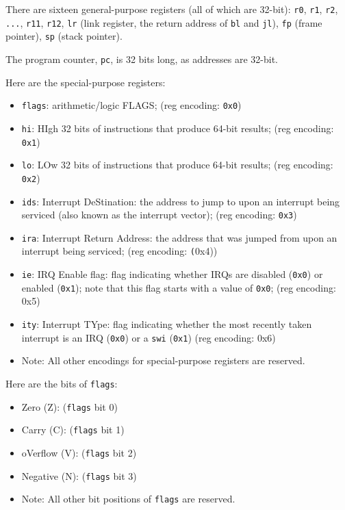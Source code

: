 \documentclass{article}
\begin{document}
	\doublespacing
	There are sixteen general-purpose registers (all of which are 32-bit):
	\texttt{r0}, \texttt{r1},
	\texttt{r2}, \texttt{...}, \texttt{r11}, \texttt{r12},
	\texttt{lr} (link register, the return address of \texttt{bl} and
		\texttt{jl}),
	\texttt{fp} (frame pointer), \texttt{sp} (stack pointer).

	The program counter, \texttt{pc}, is 32 bits long, as addresses are
	32-bit.

	Here are the special-purpose registers:
	\singlespacing
	\begin{itemize}
	\item \texttt{flags}: arithmetic/logic FLAGS;
		(reg encoding: \texttt{0x0})
	\item \texttt{hi}:
		HIgh 32 bits of instructions that produce 64-bit results;
		(reg encoding: \texttt{0x1})
	\item \texttt{lo}:
		LOw 32 bits of instructions that produce 64-bit results;
		(reg encoding: \texttt{0x2})
	\item \texttt{ids}: Interrupt DeStination:
		the address to jump to upon an interrupt being serviced
			(also known as the interrupt vector);
		(reg encoding: \texttt{0x3})
	\item \texttt{ira}: Interrupt Return Address:
		the address that was jumped from upon an interrupt being
			serviced;
		(reg encoding: \texttt(0x4))
	\item \texttt{ie}: IRQ Enable flag:
		flag indicating whether IRQs are
			disabled (\texttt{0x0}) or enabled (\texttt{0x1});
		note that this flag starts with a value of \texttt{0x0};
		(reg encoding: 0x5)
	\item \texttt{ity}: Interrupt TYpe:
		flag indicating whether the most recently taken interrupt is an
			IRQ (\texttt{0x0}) or a \texttt{swi} (\texttt{0x1})
		(reg encoding: 0x6)
	\item Note:
		All other encodings for special-purpose registers are reserved.
	\end{itemize}
	\doublespacing
	Here are the bits of \texttt{flags}:
	\singlespacing
	\begin{itemize}
	\item Zero (Z): (\texttt{flags} bit 0)
	\item Carry (C): (\texttt{flags} bit 1)
	\item oVerflow (V): (\texttt{flags} bit 2)
	\item Negative (N): (\texttt{flags} bit 3)
	\item Note:
		All other bit positions of \texttt{flags} are reserved.
	\end{itemize}
\end{document}
